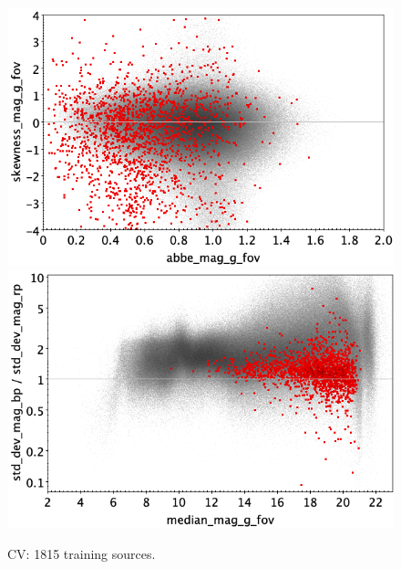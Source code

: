 \documentclass[longauth]{aa}
\begin{document}
\begin{appendix}
\begin{figure}
\vspace{4mm}
 \includegraphics[width=0.45\hsize]{figures/appendix/CV_trn_ask.png}  %
\hspace{2mm}
 \includegraphics[width=0.45\hsize]{figures/appendix/CV_trn_msdr.png}  \\ %
\vspace{4mm}
 \caption{CV: 1815 training sources.}  
 \label{fig:app:CV_trn}
\end{figure}


\end{appendix}
\end{document}
